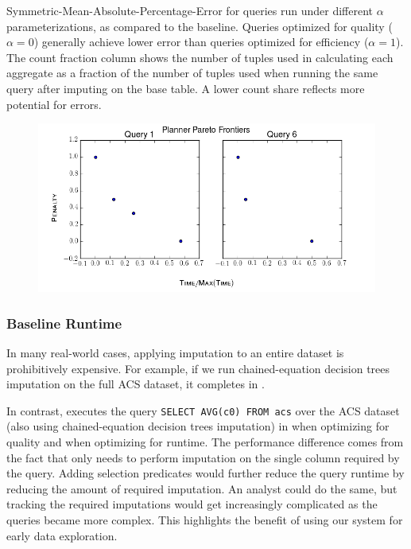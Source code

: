 \begin{table}
\centering

\caption{Symmetric-Mean-Absolute-Percentage-Error for queries run under different $\alpha$ parameterizations, as compared to the baseline.
Queries optimized
    for quality ($\alpha=0$) generally achieve lower error than queries optimized for
    efficiency ($\alpha=1$). The count fraction column shows the number of tuples used in calculating each aggregate
     as a fraction of the number of tuples used when running the same query after imputing on the base table.
    A lower count share reflects more potential for errors.}
\label{table:smape}
\end{table}

\begin{figure}
\centering
\includegraphics[scale=0.4]{figures/pareto_frontiers_plot.png}
\caption{}
\label{fig:pareto-frontiers}
\end{figure}

\subsubsection{Baseline Runtime}
In many real-world cases, applying imputation to an entire dataset is prohibitively expensive.
For example, if we run chained-equation decision trees imputation on the full ACS dataset, it completes in \acsbaseresultminutes{}.

In contrast, \ProjectName{} executes the query \lstinline{SELECT AVG(c0) FROM acs} over the ACS dataset (also using chained-equation decision trees imputation) in \acsimputedbzeroresult{} when optimizing for quality and \acsimputedboneresult{} when optimizing for runtime.
The performance difference comes from the fact that \ProjectName{} only needs to perform imputation on the single column required by the query.
Adding selection predicates would further reduce the query runtime by reducing the amount of required imputation.
An analyst could do the same, but tracking the required imputations would get increasingly complicated as the queries became more complex.
This highlights the benefit of using our system for early data exploration.

